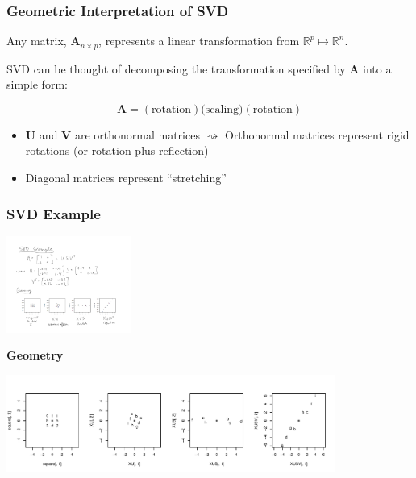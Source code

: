 \documentclass{beamer}
\newcommand{\RealN}{\ensuremath{\mathbb{R}^n}}
\newcommand{\RealP}{\ensuremath{\mathbb{R}^p}}
\newcommand{\Mtx}[1]{\ensuremath{\mathbf{#1}}}
\begin{document}
\begin{frame}
  \frametitle{Geometric Interpretation of SVD}

Any matrix, $\Mtx{A}_{n \times p}$, represents a linear transformation from $\RealP \mapsto  \RealN$. 

\medskip
SVD can be thought of decomposing the transformation specified by $\Mtx{A}$ into a simple form:

$$ \Mtx{A} = (\text{rotation})(\text{scaling)}(\text{rotation})$$

\begin{itemize}
\item $\Mtx{U}$ and $\Mtx{V}$ are orthonormal matrices $\rightsquigarrow$ Orthonormal matrices represent rigid rotations (or rotation plus reflection)
\item Diagonal matrices represent ``stretching''
\end{itemize}


\end{frame}



\begin{frame}
  \frametitle{SVD Example}

\begin{center}
\includegraphics[height=1.25in]{svd-example-mtx}
\end{center}

\medskip
\textbf{Geometry}
\begin{center}
\includegraphics[height=1.25in]{svd-example}
\end{center}

\end{frame}
\end{document}
